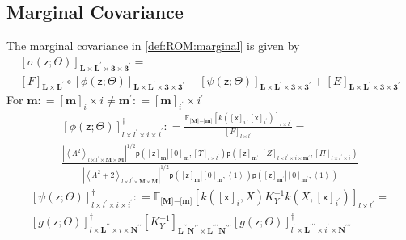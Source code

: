 \documentclass[preprint,12pt]{elsarticle}
\newcommand*{\M}[1]{\ensuremath{#1}\xspace}
\newcommand*{\x}{\times}
\newcommand*{\mi}[1]{\mathbf{#1}}
\newcommand*{\rv}[1]{\mathsf{#1}}
\newcommand*{\te}[2][]{\left\lbrack{#2}\right\rbrack_{#1}}
\newcommand*{\tse}[2][]{\mi{\lbrack#2\rbrack}_{#1}}
\newcommand*{\diag}[2][]{\left\langle{#2}\right\rangle_{#1}}
\newcommand*{\prob}[3]{\M{\mathsf{p}\!\left(\left.{#1}\right\vert{#2,#3}\right)}}
\newcommand*{\deq}{\M{\mathrel{\mathop:}=}}
\newcommand*{\evt}[3][]{\mathbb{E}_{#3}^{#1}\!#2}
\newcommand*{\modulus}[1]{\M{\left\lvert{#1}\right\rvert}}
\begin{document}
        \subsection{Marginal Covariance} \label{sub:ROM:Covariance}
            The marginal covariance in \cref{def:ROM:marginal} is given by
            \begin{multline*}
                \te[\mi{L\x L^{\prime}\x 3\x 3^{\prime}}]{\sigma(\rv{z}; \Theta)} = \\
                \te[\mi{L\x L^{\prime}}]{F} \circ \te[\mi{L\x L^{\prime}\x 3\x 3^{\prime}}]{\phi(\rv{z}; \Theta)} - 
                \te[\mi{L\x L^{\prime}\x 3\x 3^{\prime}}]{\psi(\rv{z}; \Theta)}                
                + \te[\mi{L\x L^{\prime}\x 3\x 3^{\prime}}]{E}                        
            \end{multline*}
            For $\mi{m} \deq \te[i]{\mi{m}}\x i \neq  \mi{m^{\prime}}\deq\te[i^{\prime}]{\mi{m}}\x i^{\prime}$
            \begin{multline*}
                \te[l\x l^{\prime}\x i\x i^{\prime}]{\phi(\rv{z}; \Theta)}^{\dagger}
                \deq \frac{\evt{\te[l\x l^{\prime}]{k(\te[i]{\rv{x}},\te[i^{\prime}]{\rv{x}})}}{\tse{M}\mi{-}\tse{m}}}{\te[l\x l^{\prime}]{F}} = \\
                \frac
                {\modulus{\diag[l\x l^{\prime}\x\mi{M}\x\mi{M}]{\Lambda^{2}}}^{1/2} \prob{\te[\mi{m}]{\rv{z}}}{\te[\mi{m}]{0}}{\te[l\x l^{\prime}]{\Upsilon}}\prob{\te[\mi{m^{\prime}}]{\rv{z}}}{\te[l\x l^{\prime}\x i\x\mi{m^{\prime}}]{Z}}{\te[l\x l^{\prime}\x i]{\Pi}}}
                {\modulus{\diag[l\x l^{\prime}\x\mi{M}\x\mi{M}]{\Lambda^{2}+2}}^{1/2}
                \prob{\te[\mi{m}]{\rv{z}}}{\te[\mi{m}]{0}}{\diag{1}}\prob{\te[\mi{m^{\prime}}]{\rv{z}}}{\te[\mi{m^{\prime}}]{0}}{\diag{1}}}
            \end{multline*}
            \begin{multline*}
                \te[l\x l^{\prime}\x i\x i^{\prime}]{\psi(\rv{z}; \Theta)}^{\dagger}
                \deq \evt{\te[l\x l^{\prime}]{k(\te[i]{\rv{x}},X) K_{Y}^{-1} k(X,\te[i^{\prime}]{\rv{x}})}}{\tse{M}\mi{-}\tse{m}} = \\
                \te[l\x\mi{L^{\prime\prime}}\x i \x\mi{N^{\prime\prime}}]{g({\rv{z}}; \Theta)}^{\dagger}
                \te[\mi{L^{\prime\prime}N^{\prime\prime}}\x\mi{L^{\prime\prime\prime}N^{\prime\prime\prime}}]{K_{Y}^{-1}} 
                \te[l^{\prime}\x\mi{L^{\prime\prime\prime}}\x i^{\prime} \x\mi{N^{\prime\prime\prime}}]{g({\rv{z}}; \Theta)}^{\dagger}
            \end{multline*}
\end{document}
